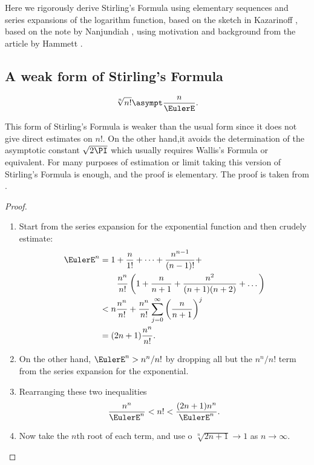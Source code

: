 \documentclass[12pt]{article}
\begin{document}
Here we rigorously derive Stirling's Formula using elementary sequences
and series expansions of the logarithm function, based on the sketch in
Kazarinoff
\cite{kazarinoff61}, based on the note by Nanjundiah
\cite{nanjundiah59}, using motivation and background from the article by
Hammett
\cite{hammett20}.

\subsection*{A weak form of Stirling's Formula}

\begin{theorem}
    \[
        \sqrt[n]{n!} \asympt \frac{n}{\EulerE}.
    \]%
    \label{thm:sequences:weakform}
\end{theorem}

\begin{remark}
    This form of Stirling's Formula is weaker than the usual form since
    it does not give direct estimates on \( n! \).  On the other hand,it
    avoids the determination of the asymptotic constant \( \sqrt{2\PI} \)
    which usually requires Wallis's Formula or equivalent.  For many
    purposes of estimation or limit taking this version of Stirling's
    Formula is enough, and the proof is elementary.  The proof is taken
    from
    \cite[pages 314-315]{saks71}.
\end{remark}

\begin{proof}
    \begin{enumerate}
        \item
            Start from the series expansion for the exponential function
            and then crudely estimate:
            \begin{align*}
              \EulerE^{n}
              &= 1 + \frac{n}{1!} + \cdots + \frac{n^{n-1}}{(n-1)!} + \\
              & \qquad  \frac{n^n}{n!}\left( 1 + \frac{n}{n+1} +
                \frac{n^2}{(n+1)(n+2)} + \dots \right) \\
                &< n \frac{n^n}{n!} + \frac{n^n}{n!} \sum_{j=0}^{\infty}
                \left( \frac{n}{n+1} \right)^j \\
                &= (2n+1) \frac{n^n}{n!}.
            \end{align*}
        \item
            On the other hand, \( \EulerE^n > n^n/n! \) by dropping all
            but the \( n^n/n! \) term from the series expansion for the
            exponential.
        \item
            Rearranging these two inequalities
            \[
                \frac{n^n}{\EulerE^n} < n!  < \frac{(2n+1) n^n}{\EulerE^n}.
            \]
        \item
            Now take the \( n \)th root of each term, and use o \( \sqrt
            [n]{2n+1} \to 1 \) as \( n \to \infty \).
    \end{enumerate}
\end{proof}
\end{document}
